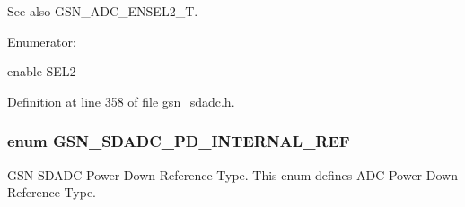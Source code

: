 \begin{DoxySeeAlso}{See also}
GSN\_\-ADC\_\-ENSEL2\_\-T. 
\end{DoxySeeAlso}
\begin{Desc}
\item[Enumerator: ]\par
\begin{description}
\item[{\em 
\hypertarget{a00652_gga940370ff6d2765c622f7687f6e6eee6aafd1575cfcab6f04a11fb0a7227ef7e85}{
GSN\_\-SDADC\_\-ENSEL2\_\-DISABLE}
\label{a00652_gga940370ff6d2765c622f7687f6e6eee6aafd1575cfcab6f04a11fb0a7227ef7e85}
}]\item[{\em 
\hypertarget{a00652_gga940370ff6d2765c622f7687f6e6eee6aa9f10996b807e2d9a21309e1b2b888210}{
GSN\_\-SDADC\_\-ENSEL2\_\-ENABLE}
\label{a00652_gga940370ff6d2765c622f7687f6e6eee6aa9f10996b807e2d9a21309e1b2b888210}
}]enable SEL2 \end{description}
\end{Desc}



Definition at line 358 of file gsn\_\-sdadc.h.

\hypertarget{a00652_ga3fd8f1ef5efcdbab4b29cdd40ca09a32}{
\subsubsection[{GSN\_\-SDADC\_\-PD\_\-INTERNAL\_\-REF}]{\setlength{\rightskip}{0pt plus 5cm}enum {\bf GSN\_\-SDADC\_\-PD\_\-INTERNAL\_\-REF}}}
\label{a00652_ga3fd8f1ef5efcdbab4b29cdd40ca09a32}


GSN SDADC Power Down Reference Type. This enum defines ADC Power Down Reference Type. 

